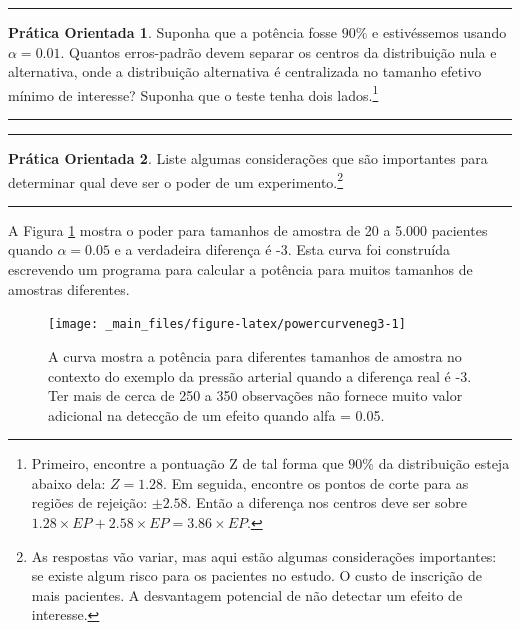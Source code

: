 \documentclass[
]{book}
\theoremstyle{definition}
\theoremstyle{definition}
\theoremstyle{definition}
\newtheorem{exercise}{Prática Orientada}[chapter]
\theoremstyle{definition}
\theoremstyle{remark}
\begin{document}
\begin{center}\rule{0.5\linewidth}{0.5pt}\end{center}

\begin{exercise}
\protect\hypertarget{exr:unnamed-chunk-218}{}{\label{exr:unnamed-chunk-218} }Suponha que a potência fosse \(90\%\) e estivéssemos usando \(\alpha = 0.01\). Quantos erros-padrão devem separar os centros da distribuição nula e alternativa, onde a distribuição alternativa é centralizada no tamanho efetivo mínimo de interesse? Suponha que o teste tenha dois lados.\footnote{Primeiro, encontre a pontuação Z de tal forma que \(90\%\) da distribuição esteja abaixo dela: \(Z = 1.28\). Em seguida, encontre os pontos de corte para as regiões de rejeição: \(\pm 2.58\). Então a diferença nos centros deve ser sobre \(1.28 \times EP + 2.58 \times EP = 3.86 \times EP\).}
\end{exercise}

\begin{center}\rule{0.5\linewidth}{0.5pt}\end{center}

\begin{center}\rule{0.5\linewidth}{0.5pt}\end{center}

\begin{exercise}
\protect\hypertarget{exr:unnamed-chunk-219}{}{\label{exr:unnamed-chunk-219} }Liste algumas considerações que são importantes para determinar qual deve ser o poder de um experimento.\footnote{As respostas vão variar, mas aqui estão algumas considerações importantes: se existe algum risco para os pacientes no estudo. O custo de inscrição de mais pacientes. A desvantagem potencial de não detectar um efeito de interesse.}
\end{exercise}

\begin{center}\rule{0.5\linewidth}{0.5pt}\end{center}

A Figura \ref{fig:powercurveneg3} mostra o poder para tamanhos de amostra de 20 a 5.000 pacientes quando \(\alpha = 0.05\) e a verdadeira diferença é -3. Esta curva foi construída escrevendo um programa para calcular a potência para muitos tamanhos de amostras diferentes.

\begin{figure}
\texttt{[image: \_main\_files/figure-latex/powercurveneg3-1]} \caption{A curva mostra a potência para diferentes tamanhos de amostra no contexto do exemplo da pressão arterial quando a diferença real é -3. Ter mais de cerca de 250 a 350 observações não fornece muito valor adicional na detecção de um efeito quando alfa = 0.05.}\label{fig:powercurveneg3}
\end{figure}
\end{document}

